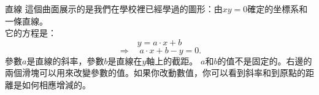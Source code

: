 \begin{surferPage}{直線}
這個曲面展示的是我們在學校裡已經學過的圖形：由$xy=0$確定的坐標系和一條直線。\\它的方程是：
\[y=a\cdot x + b\]
\[ \Rightarrow \quad a\cdot x +b -y=0.\]
參數$a$是直線的斜率，參數$b$是直線在$y$軸上的截距。
\newline \newline
$a$和$b$的值不是固定的。右邊的兩個滑塊可以用來改變參數的值。如果你改動數值，你可以看到斜率和到原點的距離是如何相應增減的。
\end{surferPage}
